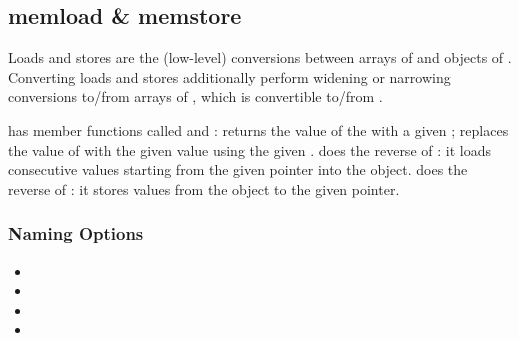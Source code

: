 \subsection{memload \& memstore}
Loads and stores are the (low-level) conversions between arrays of  and objects of .
Converting loads and stores additionally perform widening or narrowing conversions to/from arrays of , which is convertible to/from .

 has member functions called  and :  returns the value of the  with a given ;  replaces the value of  with the given value using the given .
 does the reverse of : it loads  consecutive values starting from the given pointer into the  object.
 does the reverse of : it stores  values from the  object to the given pointer.

\subsubsection{Naming Options}

\begin{itemize}
  \item {}
  \item {}
  \item {}
  \item {}
\end{itemize}


